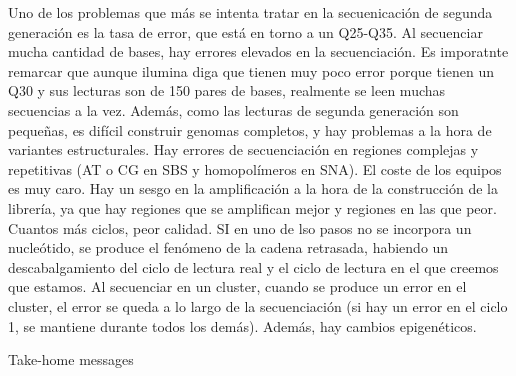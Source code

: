 Uno de los problemas que más se intenta tratar en la secuenicación de segunda generación es la tasa de error, que está en torno a un Q25-Q35. Al secuenciar mucha cantidad de bases, hay errores elevados en la secuenciación. Es imporatnte remarcar que aunque ilumina diga que tienen muy poco error porque tienen un Q30 y sus lecturas son de 150 pares de bases, realmente se leen muchas secuencias a la vez.
Además, como las lecturas de segunda generación son pequeñas, es difícil construir genomas completos, y hay problemas a la hora de variantes estructurales. Hay errores de secuenciación en regiones complejas y repetitivas (AT o CG en SBS y homopolímeros en SNA). El coste de los equipos es muy caro. Hay un sesgo en la amplificación a la hora de la construcción de la librería, ya que hay regiones que se amplifican mejor y regiones en las que peor. Cuantos más ciclos, peor calidad. SI en uno de lso pasos no se incorpora un nucleótido, se produce el fenómeno de la cadena retrasada, habiendo un descabalgamiento del ciclo de lectura real y el ciclo de lectura en el que creemos que estamos. Al secuenciar en un cluster, cuando se produce un error en el cluster, el error se queda a lo largo de la secuenciación (si hay un error en el ciclo 1, se mantiene durante todos los demás). Además, hay cambios epigenéticos.

Take-home messages